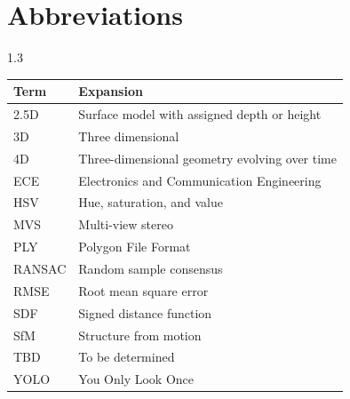 \chapter*{Abbreviations}
\begin{spacing}{1.3}
\noindent\begin{tabular}{p{}p{}}
\textbf{Term} & \textbf{Expansion}\\\hline
2.5D & Surface model with assigned depth or height\\
3D & Three dimensional\\
4D & Three-dimensional geometry evolving over time\\
ECE & Electronics and Communication Engineering\\
HSV & Hue, saturation, and value\\
MVS & Multi-view stereo\\
PLY & Polygon File Format\\
RANSAC & Random sample consensus\\
RMSE & Root mean square error\\
SDF & Signed distance function\\
SfM & Structure from motion\\
TBD & To be determined\\
YOLO & You Only Look Once\\
\end{tabular}
\end{spacing}\clearpage
